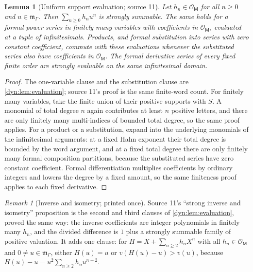 \documentclass[11pt,letterpaper]{article}
\newtheorem{lemma}[lemma]{Lemma}
\theoremstyle{definition}
\theoremstyle{remark}
\newtheorem{remark}[remark]{Remark}
\newcommand{\OO}{\mathcal O}
\newcommand{\m}{\mathfrak m}
\numberwithin{equation}{section}
\begin{document}
\begin{lemma}[Uniform support evaluation; source 11]
\label{dyn:rd:lem:evaluation}
Let $h_n\in\OO_{\mathsf M}$ for all $n\ge0$ and $u\in\m_\Gamma$. Then
$\sum_{n\ge0}h_nu^{n}$ is strongly summable. The same holds for a formal
power series in finitely many variables with coefficients in
$\OO_{\mathsf M}$, evaluated at a tuple of infinitesimals. Products, and
formal substitution into series with zero constant coefficient, commute with
these evaluations whenever the substituted series also have coefficients in
$\OO_{\mathsf M}$. The formal derivative series of every fixed finite order
are strongly evaluable on the same infinitesimal domain.
\end{lemma}
\begin{proof}
The one-variable clause and the substitution clause are
\cref{dyn:lem:evaluation}; source 11's proof is the same finite-word count.
For finitely many variables, take the finite union of their positive
supports with $S$. A monomial of total degree $n$ again contributes at least
$n$ positive letters, and there are only finitely many multi-indices of
bounded total degree, so the same proof applies. For a product or a
substitution, expand into the underlying monomials of the infinitesimal
arguments: at a fixed Hahn exponent their total degree is bounded by the
word argument, and at a fixed total degree there are only finitely many
formal composition partitions, because the substituted series have zero
constant coefficient. Formal differentiation multiplies coefficients by
ordinary integers and lowers the degree by a fixed amount, so the same
finiteness proof applies to each fixed derivative.
\end{proof}

\begin{remark}[Inverse and isometry; printed once]\label{dyn:rd:rem:inverse}
Source 11's ``strong inverse and isometry'' proposition is the second and
third clauses of \cref{dyn:lem:evaluation}, proved the same way: the
inverse coefficients are integer polynomials in finitely many $h_n$, and the
divided difference is $1$ plus a strongly summable family of positive
valuation. It adds one clause: for $H=X+\sum_{n\ge2}h_nX^{n}$ with all
$h_n\in\OO_{\mathsf M}$ and $0\ne u\in\m_\Gamma$, either $H(u)=u$ or
$v(H(u)-u)>v(u)$, because $H(u)-u=u^{2}\sum_{n\ge2}h_nu^{n-2}$.
\end{remark}
\end{document}
